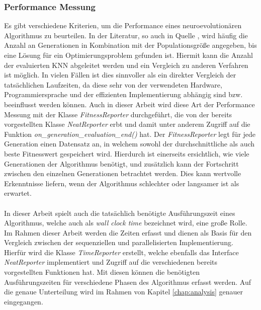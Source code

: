 \subsubsection{Performance Messung}
Es gibt verschiedene Kriterien, um die Performance eines neuroevolutionären Algorithmus zu beurteilen. In der Literatur, so auch in Quelle \cite{stanley2002evolving}, wird häufig die Anzahl an Generationen in Kombination mit der Populationsgröße angegeben, bis eine Lösung für ein Optimierungsproblem gefunden ist. Hiermit kann die Anzahl der evaluierten \ac{KNN} abgeleitet werden und ein Vergleich zu anderen Verfahren ist möglich. In vielen Fällen ist dies sinnvoller als ein direkter Vergleich der tatsächlichen Laufzeiten, da diese sehr von der verwendeten Hardware, Programmiersprache und der effizienten Implementierung abhängig sind bzw. beeinflusst werden können. Auch in dieser Arbeit wird diese Art der Performance Messung mit der Klasse \emph{FitnessReporter} durchgeführt, die von der bereits vorgestellten Klasse \emph{NeatReporter} erbt und damit unter anderem Zugriff auf die Funktion \emph{on\_generation\_evaluation\_end()} hat. Der \emph{FitnessReporter} legt für jede Generation einen Datensatz an, in welchem sowohl der durchschnittliche als auch beste Fitnesswert gespeichert wird. Hierdurch ist einerseits ersichtlich, wie viele Generationen der Algorithmus benötigt, und zusätzlich kann der Fortschritt zwischen den einzelnen Generationen betrachtet werden. Dies kann wertvolle Erkenntnisse liefern, wenn der Algorithmus schlechter oder langsamer ist als erwartet. 
\\\\
In dieser Arbeit spielt auch die tatsächlich benötigte Ausführungszeit eines Algorithmus, welche auch als \emph{wall clock time} bezeichnet wird, eine große Rolle. Im Rahmen dieser Arbeit werden die Zeiten erfasst und dienen als Basis für den Vergleich zwischen der sequenziellen und parallelisierten Implementierung. Hierfür wird die Klasse \emph{TimeReporter} erstellt, welche ebenfalls das Interface \emph{NeatReporter} implementiert und Zugriff auf die verschiedenen bereits vorgestellten Funktionen hat. Mit diesen können die benötigten Ausführungszeiten für verschiedene Phasen des Algorithmus erfasst werden. Auf die genaue Unterteilung wird im Rahmen von Kapitel \ref{chap:analysis} genauer eingegangen. 

